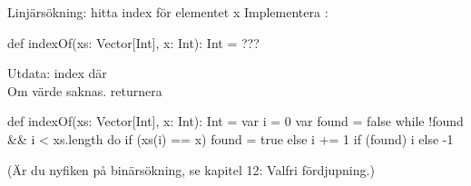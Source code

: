 %

\begin{Slide}{Linjärsökning: hitta index för elementet x}
Implementera :
\begin{Code}
def indexOf(xs: Vector[Int], x: Int): Int = ???
\end{Code}
Utdata: index  där \\Om värde saknas. returnera 
\pause
\begin{Code}
def indexOf(xs: Vector[Int], x: Int): Int = 
  var i = 0
  var found = false
  while !found && i < xs.length do
    if (xs(i) == x) found = true
    else i += 1
  if (found) i else -1
\end{Code}
(Är du nyfiken på binärsökning, se kapitel 12: Valfri fördjupning.)
\end{Slide}

